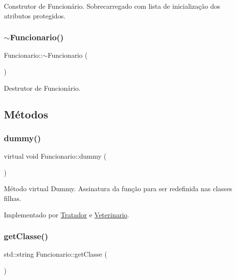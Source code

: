 Construtor de Funcionário. Sobrecarregado com lista de inicialização dos atributos protegidos. \mbox{\label{classFuncionario_a800273bd909dc88f821a414abebc442c}} 
\subsubsection{\texorpdfstring{$\sim$\+Funcionario()}{~Funcionario()}}
{\footnotesize\ttfamily Funcionario\+::$\sim$\+Funcionario (\begin{DoxyParamCaption}{ }\end{DoxyParamCaption})}

Destrutor de Funcionário. 

\subsection{Métodos}
\mbox{\label{classFuncionario_a56aa6d780ba9ac728fad0cde3a71e9d8}} 
\subsubsection{\texorpdfstring{dummy()}{dummy()}}
{\footnotesize\ttfamily virtual void Funcionario\+::dummy (\begin{DoxyParamCaption}{ }\end{DoxyParamCaption})\hspace{0.3cm}{\ttfamily [pure virtual]}}

Método virtual Dummy. Assinatura da função para ser redefinida nas classes filhas. 

Implementado por \hyperlink{classTratador_a399c02d81fb4e7adaeda1d5e68afbca8}{Tratador} e \hyperlink{classVeterinario_a1a5663f1ff2c9717df7634e0f0d1eb8d}{Veterinario}.

\mbox{\label{classFuncionario_aedbde8ce3c50377656b3559793b6a182}} 
\subsubsection{\texorpdfstring{get\+Classe()}{getClasse()}}
{\footnotesize\ttfamily std\+::string Funcionario\+::get\+Classe (\begin{DoxyParamCaption}{ }\end{DoxyParamCaption})}

